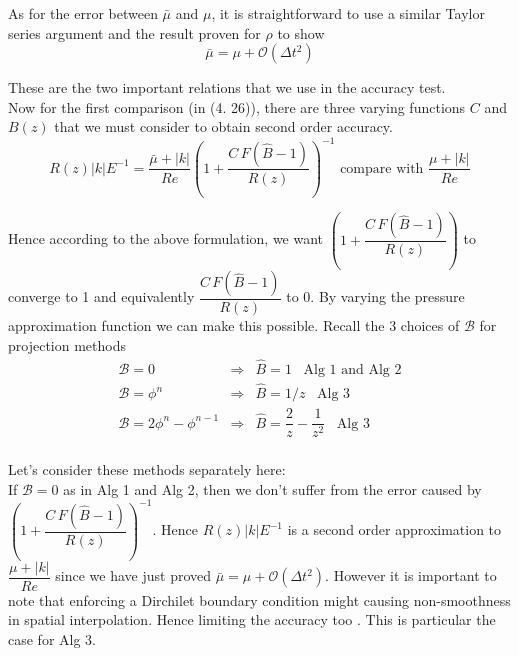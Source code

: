 As for the error between $\bar{\mu}$ and $\mu$, it is straightforward to use a similar Taylor series argument and the result proven for $\rho$ to show 
\begin{equation}
\bar{\mu} = \mu + \mathcal{O}(\Delta t^2)
\end{equation}

These are the two important relations that we use in the accuracy test.\\

Now for the first comparison (in (4. 26)), there are three varying functions $C$ and $B(z)$ that we must consider to obtain second order accuracy.
\begin{equation*}
R(z) |k|E^{-1} = \dfrac{\bar{\mu} + |k|}{Re}(1 + \dfrac{C \, F(\hat{B} - 1)}{R(z)})^{-1} \text{ compare with } \dfrac{\mu + |k|}{Re} 
\end{equation*}

Hence according to the above formulation, we want $(1 + \dfrac{C \, F(\hat{B} - 1)}{R(z)})$ to converge to 1 and equivalently $\dfrac{C \, F(\hat{B} - 1)}{R(z)}$ to 0. By varying the pressure approximation function we can make this possible. Recall the 3 choices of $\mathcal{B}$ for projection methods
\begin{equation}
\begin{array}{lcl}
\mathcal{B} = 0 & \Rightarrow & \hat{B} = 1 \, \, \, \text{      Alg 1 and Alg 2}\\

\mathcal{B} = \phi^n & \Rightarrow & \hat{B} = 1/z \, \, \, \text{      Alg 3}\\

\mathcal{B} = 2\phi^n - \phi^{n-1} & \Rightarrow & \hat{B} = \dfrac{2}{z} - \dfrac{1}{z^2} \, \, \, \text{         Alg 3}\\
\end{array}
\end{equation}

Let's consider these methods separately here:\\

If $\mathcal{B} = 0$ as in Alg 1 and Alg 2, then we don't suffer from the error caused by $(1 + \dfrac{C \, F(\hat{B} - 1)}{R(z)})^{-1}$. Hence $R(z) |k|E^{-1}$ is a second order approximation to $\dfrac{\mu + |k|}{Re} $ since we have just proved $\bar{\mu} = \mu + \mathcal{O} (\Delta t^2)$. However it is important to note that enforcing a Dirchilet boundary condition might causing non-smoothness in spatial interpolation. Hence limiting the accuracy too \cite{strikwerda1999accuracy}. This is particular the case for Alg 3.\\

